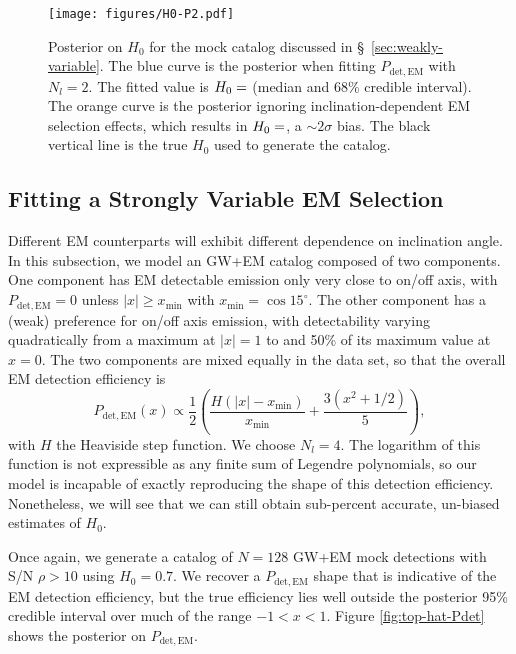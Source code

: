 \documentclass[modern]{aastex631}
\newcommand{\detected}{\mathrm{det}}
\newcommand{\EM}{\mathrm{EM}}
\begin{document}
\begin{figure}
    \texttt{[image: figures/H0-P2.pdf]}
    \caption{Posterior on $H_0$ for the mock catalog discussed in \S\,
    \ref{sec:weakly-variable}.  The blue curve is the posterior when fitting
    $P_{\detected,\EM}$ with $N_l = 2$.  The fitted value is $H_0 =
    \variable{output/H0-P2.txt}$ (median and 68\% credible interval).  The
    orange curve is the posterior ignoring inclination-dependent EM selection
    effects, which results in $H_0 = \variable{output/H0-P2-nofit.txt}$, a $\sim
    2\sigma$ bias.  The black vertical line is the true $H_0$ used to generate
    the catalog.}
    \label{fig:H0-P2}
\end{figure}

\subsection{Fitting a Strongly Variable EM Selection}
\label{sec:strongly-variable}

Different EM counterparts will exhibit different dependence on inclination
angle.  In this subsection, we model an GW+EM catalog composed of two
components.  One component has EM detectable emission only very close to on/off
axis, with $P_{\detected,\EM} = 0$ unless $|x| \geq x_\mathrm{min}$ with
$x_\mathrm{min} = \cos 15^\circ$.  The other component has a (weak) preference
for on/off axis emission, with detectability varying quadratically from a
maximum at $|x| = 1$ to and 50\% of its maximum value at $x = 0$.  The two
components are mixed equally in the data set, so that the overall EM detection
efficiency is 
\begin{equation}
    P_{\detected,\EM}(x) \propto \frac{1}{2} \left( \frac{H\left( |x| - x_\mathrm{min} \right)}{x_\mathrm{min}} + \frac{3 \left( x^2 + 1/2 \right)}{5} \right),
\end{equation}
with $H$ the Heaviside step function.  We choose $N_l = 4$.  The logarithm of
this function is not expressible as any finite sum of Legendre polynomials, so
our model is incapable of exactly reproducing the shape of this detection
efficiency.  Nonetheless, we will see that we can still obtain sub-percent
accurate, un-biased estimates of $H_0$.

Once again, we generate a catalog of $N = 128$ GW+EM mock detections with S/N
$\rho > 10$ using $H_0 = 0.7$.  We recover a $P_{\detected,\EM}$ shape that is
indicative of the EM detection efficiency, but the true efficiency lies well
outside the posterior 95\% credible interval over much of the range $-1 < x <
1$.  Figure \ref{fig:top-hat-Pdet} shows the posterior on $P_{\detected,\EM}$.
\end{document}
